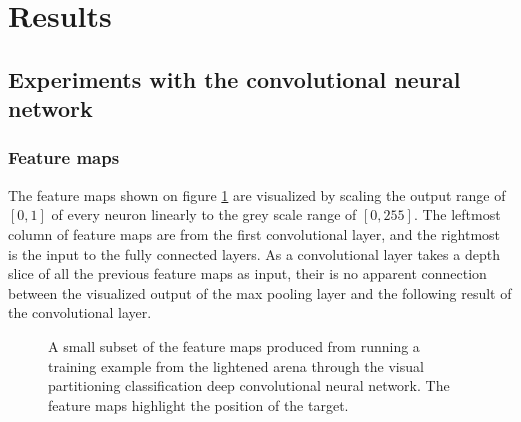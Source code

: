 
\section{Results}
\label{sec:results}

\subsection{Experiments with the convolutional neural network}


\subsubsection{Feature maps}
The feature maps shown on figure \ref{fig:featuremaps} are visualized by scaling the output range of $[0,1]$ of every neuron linearly to the grey scale range of $[0,255]$. The leftmost column of feature maps are from the first convolutional layer, and the rightmost is the input to the fully connected layers. As a convolutional layer takes a depth slice of all the previous feature maps as input, their is no apparent connection between the visualized output of the max pooling layer and the following result of the convolutional layer.

\begin{figure}[H]
	\begin{scriptsize}
		\sffamily
		\def\svgwidth{\textwidth}
		
	\end{scriptsize}
	\caption{A small subset of the feature maps produced from running a training example from the lightened arena through the visual partitioning classification deep convolutional neural network. The feature maps highlight the position of the target.}
	\label{fig:featuremaps}
\end{figure}


%
%
